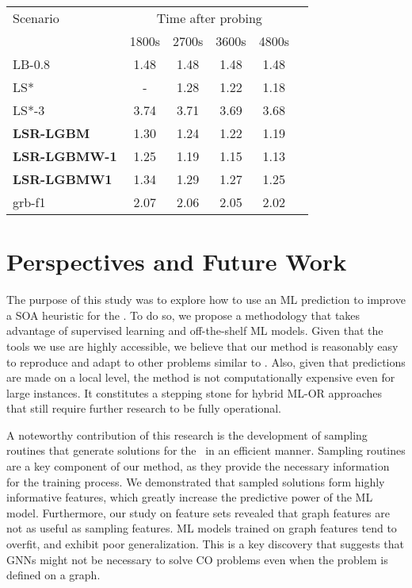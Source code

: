 \documentclass[3p, authoryear, times, doubleblind]{elsarticle}
\begin{document}
{\begin{table}[h]
\centering
\caption{}
\label{tab:fcn:gap_over_time_D}
\begin{tabular}{lccccc}
\toprule
{Scenario} & \multicolumn{4}{c}{Time after probing} \\
{} & {1800s} & {2700s} & {3600s} & {4800s} \\
\midrule
LB-0.8 & 1.48 & 1.48 & 1.48 & 1.48 \\
LS* & - & 1.28 & 1.22 & 1.18 \\
LS*-3 & 3.74 & 3.71 & 3.69 & 3.68 \\
\textbf{LSR-LGBM} & 1.30 & 1.24 & 1.22 & 1.19 \\
\textbf{LSR-LGBMW-1} & 1.25 & 1.19 & 1.15 & 1.13 \\
\textbf{LSR-LGBMW1} & 1.34 & 1.29 & 1.27 & 1.25 \\
grb-f1 & 2.07 & 2.06 & 2.05 & 2.02 \\
\bottomrule
\end{tabular}
\end{table}


\section{Perspectives and Future Work}
\label{sec:conclusion}

The purpose of this study was to explore how to use an ML prediction to improve a SOA heuristic for the \fcn. To do so, we propose a methodology that takes advantage of supervised learning and off-the-shelf ML models. Given that the tools we use are highly accessible, we believe that our method is reasonably easy to reproduce and adapt to other problems similar to \fcn. Also, given that predictions are made on a local level, the method is not computationally expensive even for large instances. It constitutes a stepping stone for hybrid ML-OR approaches that still require further research to be fully operational. 

A noteworthy contribution of this research is the development of sampling routines that generate solutions for the \fcn\ in an efficient manner. Sampling routines are a key component of our method, as they provide the necessary information for the training process. We demonstrated that sampled solutions form highly informative features, which greatly increase the predictive power of the ML model. Furthermore, our study on feature sets revealed that graph features are not as useful as sampling features. ML models trained on graph features tend to overfit, and exhibit poor generalization. This is a key discovery that suggests that GNNs might not be necessary to solve CO problems even when the problem is defined on a graph.

}
\end{document}
